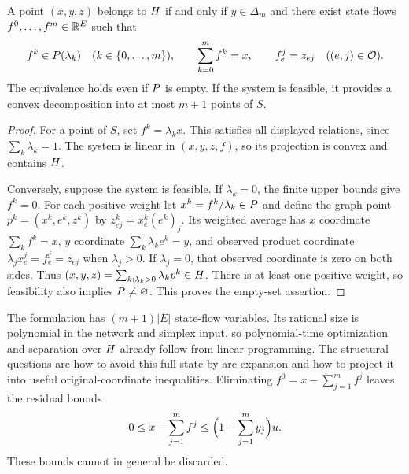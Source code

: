 \begin{proposition}\label{prop:disaggregation}
A point $(x,y,z)$ belongs to $H$ if and only if $y\in\Delta_m$ and
there exist state flows $f^0,\ldots,f^m\in\mathbb R^E$ such that
\begin{equation}\label{eq:disaggregation}
 f^k\in P(\lambda_k)\quad(k\in\{0,\ldots,m\}),\qquad
 \sum_{k=0}^m f^k=x,\qquad
 f^j_e=z_{ej}\quad((e,j)\in\mathcal O).
\end{equation}
The equivalence holds even if $P$ is empty. If the system is feasible,
it provides a convex decomposition into at most $m+1$ points of $S$.
\end{proposition}
\begin{proof}
For a point of $S$, set $f^k=\lambda_k x$. This satisfies all displayed
relations, since $\sum_k\lambda_k=1$. The system is linear in
$(x,y,z,f)$, so its projection is convex and contains $H$.

Conversely, suppose the system is feasible. If $\lambda_k=0$, the finite
upper bounds give $f^k=0$. For each positive weight let
$x^k=f^k/\lambda_k\in P$ and define the graph point
$p^k=(x^k,e^k,z^k)$ by
$z^k_{ej}=x^k_e(e^k)_j$. Its weighted average has $x$ coordinate
$\sum_k f^k=x$, $y$ coordinate $\sum_k\lambda_k e^k=y$, and observed
product coordinate $\lambda_j x^j_e=f^j_e=z_{ej}$ when
$\lambda_j>0$. If $\lambda_j=0$, that observed coordinate is zero on both
sides. Thus $(x,y,z)=\sum_{k:\lambda_k>0}\lambda_k p^k\in H$.
There is at least one positive weight, so feasibility also implies
$P\ne\varnothing$. This proves the empty-set assertion.
\end{proof}

The formulation has $(m+1)|E|$ state-flow variables. Its rational size is
polynomial in the network and simplex input, so polynomial-time optimization
and separation over $H$ already follow from linear programming. The
structural questions are how to avoid this full state-by-arc expansion and
how to project it into useful original-coordinate inequalities.
Eliminating $f^0=x-\sum_{j=1}^m f^j$ leaves the residual bounds
\begin{equation}\label{eq:residual-bounds}
 0\le x-\sum_{j=1}^m f^j\le
       \Bigl(1-\sum_{j=1}^m y_j\Bigr)u.
\end{equation}
These bounds cannot in general be discarded.

